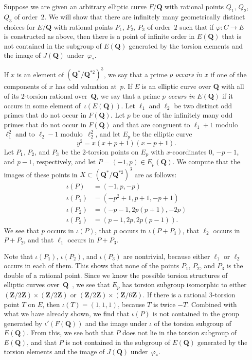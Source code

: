 \documentclass{amsart}
\theoremstyle{remark}
\begin{document}
Suppose we are given an arbitrary elliptic curve $F/{{\mathbf{Q}}}$ with rational points
$Q_1$, $Q_2$, $Q_3$ of order~$2$. We will show that there are infinitely many
geometrically distinct choices for $E/{{\mathbf{Q}}}$ with rational points $P_1$, $P_2$, 
$P_3$ of order~$2$ such that if $\varphi\colon C\to E$ is constructed as 
above, then there is a point of infinite order in $E({{\mathbf{Q}}})$ that is not 
contained in the subgroup of $E({{\mathbf{Q}}})$ generated by the torsion elements and the
image of $J({{\mathbf{Q}}})$ under~$\varphi_*$.

If $x$ is an element of $({{\mathbf{Q}}}^*/{{\mathbf{Q}}}^{*2})^3$, we say that a prime $p$ 
\emph{occurs in $x$} if one of the components of $x$ has odd valuation at~$p$.
If $E$ is an elliptic curve over ${{\mathbf{Q}}}$ with all of its $2$-torsion rational 
over~${{\mathbf{Q}}}$, we say that a prime $p$ \emph{occurs in $E({{\mathbf{Q}}})$} if it occurs in
some element of~$\iota(E({{\mathbf{Q}}}))$. Let $\ell_1$ and $\ell_2$ be two distinct odd 
primes that do not occur in $F({{\mathbf{Q}}})$. Let $p$ be one of the infinitely many odd
primes that do not occur in $F({{\mathbf{Q}}})$ and that are congruent to $\ell_1+1$
modulo $\ell_1^2$ and to $\ell_2-1$ modulo~$\ell_2^2$, and let $E_p$ be the 
elliptic curve
\[
y^2 = x (x + p+1) (x - p + 1).
\]
Let $P_1$, $P_2$, and $P_3$ be the $2$-torsion points on $E_p$ with 
$x$-coordinates $0$, $-p-1$, and $p-1$, respectively, and let 
$P = (-1,p)\in E_p({{\mathbf{Q}}})$.  We compute that the images of these points in 
$X \subset ({{\mathbf{Q}}}^*/{{\mathbf{Q}}}^{*2})^3$ are as follows:
\begin{align*}
\iota(P)   &= (-1, p, -p) \\
\iota(P_1) &= (-p^2+1, p+1, -p+1) \\
\iota(P_2) &= (-p-1, 2p(p+1),-2p) \\
\iota(P_3) &= (p-1,2p,2p(p-1)).
\end{align*}
We see that $p$ occurs in $\iota(P)$, that $p$ occurs in $\iota(P+P_1)$, that
$\ell_2$ occurs in $P+P_2$, and that $\ell_1$ occurs in $P+P_3$.

Note that $\iota(P_1)$, $\iota(P_2)$, and $\iota(P_3)$ are nontrivial, because
either $\ell_1$ or $\ell_2$ occurs in each of them. This shows that none of the
points $P_1$, $P_2$, and $P_3$ is the double of a rational point.  Since we
know the possible torsion structures of elliptic curves 
over~${{\mathbf{Q}}}$~\cite[Theorem~8, p.~35]{Mazur1977}, we see that $E_p$ has torsion
subgroup isomorphic to either $({{\mathbf{Z}}}/2{{\mathbf{Z}}})\times ({{\mathbf{Z}}}/2{{\mathbf{Z}}})$ or
$({{\mathbf{Z}}}/2{{\mathbf{Z}}})\times ({{\mathbf{Z}}}/6{{\mathbf{Z}}})$.  If there is a rational $3$-torsion point $T$
on $E$, then $\iota(T) = (1,1,1)$, because $T$ is twice $-T$. Combined with 
what we have already shown, we find that $\iota(P)$ is not contained in the 
group generated by $\iota'(F({{\mathbf{Q}}}))$ and the image under $\iota$ of the torsion
subgroup of $E({{\mathbf{Q}}})$.  From this, we see both that $P$ does not lie in the 
torsion subgroup of $E({{\mathbf{Q}}})$, and that $P$ is not contained in the subgroup of
$E({{\mathbf{Q}}})$ generated by the torsion elements and the image of $J({{\mathbf{Q}}})$ 
under~$\varphi_*$.
\end{document}
